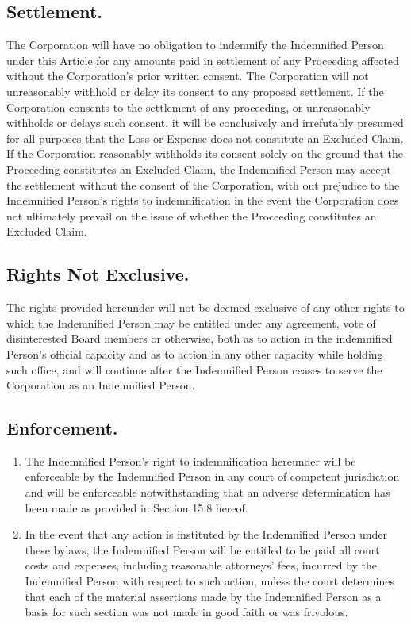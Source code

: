 \documentclass[11pt,american,letterpaper,]{constitution}
\begin{document}
\subsection{Settlement.} 

The Corporation will have no obligation to indemnify the Indemnified Person under this Article for any amounts paid in settlement of any Proceeding affected without the Corporation's prior written consent. The Corporation will not unreasonably withhold or delay its consent to any proposed settlement. If the Corporation consents to the settlement of any proceeding, or unreasonably withholds or delays such consent, it will be conclusively and irrefutably presumed for all purposes that the Loss or Expense does not constitute an Excluded Claim. If the Corporation reasonably withholds its consent solely on the ground that the Proceeding constitutes an Excluded Claim, the Indemnified Person may accept the settlement without the consent of the Corporation, with out prejudice to the Indemnified Person's rights to indemnification in the event the Corporation does not ultimately prevail on the issue of whether the Proceeding constitutes an Excluded Claim.

\subsection{Rights Not Exclusive.} 

The rights provided hereunder will not be deemed exclusive of any other rights to which the Indemnified Person may be entitled under any agreement, vote of disinterested Board members or otherwise, both as to action in the indemnified Person's official capacity and as to action in any other capacity while holding such office, and will continue after the Indemnified Person ceases to serve the Corporation as an Indemnified Person.

\subsection{Enforcement. } 
\begin{enumerate}
\item The Indemnified Person's right to indemnification hereunder will be enforceable by the Indemnified Person in any court of competent jurisdiction and will be enforceable notwithstanding that an adverse determination has been made as provided in Section 15.8 hereof. 
\item In the event that any action is instituted by the Indemnified Person under these bylaws, the Indemnified Person will be entitled to be paid all court costs and expenses, including reasonable attorneys' fees, incurred by the Indemnified Person with respect to such action, unless the court determines that each of the material assertions made by the Indemnified Person as a basis for such section was not made in good faith or was frivolous.
\end{enumerate}
\end{document}
